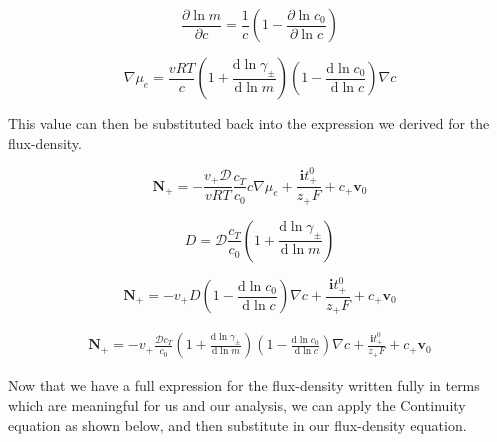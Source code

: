 \documentclass[lettersize,journal]{IEEEtran}
\begin{document}
\begin{equation}
\frac{\partial \ln m}{\partial c}=\frac{1}{c}\left(1-\frac{\partial \ln c_{0}}{\partial \ln c}\right)
\end{equation}

\begin{equation}
\nabla \mu_{e}=\frac{v R T}{c}\left(1+\frac{\mathrm{d} \ln \gamma_{\pm}}{\mathrm{d} \ln m}\right)\left(1-\frac{\mathrm{d} \ln c_{0}}{\mathrm{~d} \ln c}\right) \nabla c
\end{equation}

This value can then be substituted back into the expression we derived for the flux-density.

\begin{equation}
\mathbf{N}_{+}=-\frac{v_{+} \mathscr{D}}{v R T} \frac{c_{T}}{c_{0}} c \nabla \mu_{e}+\frac{\mathbf{i} t_{+}^{0}}{z_{+} F}+c_{+} \mathbf{v}_{0}
\end{equation}


\begin{equation}
D=\mathscr{D} \frac{c_{T}}{c_{0}}\left(1+\frac{\mathrm{d} \ln \gamma_{\pm}}{\mathrm{d} \ln m}\right)
\end{equation}

\begin{equation}
\mathbf{N}_{+}=-v_{+} D\left(1-\frac{\mathrm{d} \ln c_{0}}{\mathrm{~d} \ln c}\right) \nabla c+\frac{\mathbf{i} t_{+}^{0}}{z_{+} F}+c_{+} \mathbf{v}_{0}
\end{equation}





















\begin{equation}
\begin{aligned}
\mathbf{N}_{+} =-v_{+} \frac{\mathscr{D} c_{T}}{c_{0}}\left(1+\frac{\mathrm{d} \ln \gamma_{\pm}}{\mathrm{d} \ln m}\right)\left(1-\frac{\mathrm{d} \ln c_{0}}{\mathrm{~d} \ln c}\right) \nabla c+\frac{\mathbf{i} t_{+}^{0}}{z_{+} F}+c_{+} \mathbf{v}_{0}
\end{aligned}
\end{equation}


Now that we have a full expression for the flux-density written fully in terms which are meaningful for us and our analysis, we can apply the Continuity equation as shown below, and then substitute in our flux-density equation.
\end{document}
